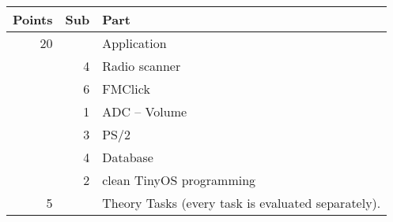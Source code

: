 \documentclass[a4paper,10pt]{article}
\begin{document}
\begin{tabular}{|r|r p{8.5cm}|}
\hline
Points & Sub & Part\\
\hline
20 &   & Application \\
   & 4 & Radio scanner \\
   & 6 & FMClick  \\
   & 1 & ADC -- Volume \\
   & 3 & PS/2 \\
   & 4 & Database\\
   & 2 & clean TinyOS programming \\
\hline
\hline
5 &   & Theory Tasks (every task is evaluated separately).\\
\hline
\end{tabular}




\end{document}

